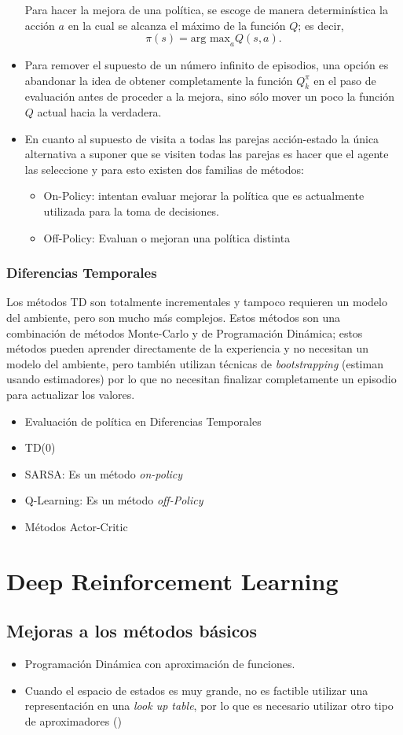 \documentclass[11pt]{article}
\theoremstyle{plain}
\begin{document}
\begin{itemize}
Para hacer la mejora de una política, se escoge de manera determinística la acción $a$ en la cual se alcanza el máximo de la función $Q$; es decir,
\[ \pi(s) = \textrm{arg max}_a Q(s,a).\]
\item Para remover el supuesto de un número infinito de episodios, una opción es abandonar la idea de obtener completamente la función $Q^\pi_k$ en el paso de evaluación antes de proceder a la mejora, sino sólo mover un poco la función $Q$ actual hacia la verdadera.
\item En cuanto al supuesto de visita a todas las parejas acción-estado la única alternativa a suponer que se visiten todas las parejas es hacer que el agente las seleccione y para esto existen dos familias de métodos:
							\begin{itemize}
									\item On-Policy: intentan evaluar mejorar la política que es actualmente utilizada para la toma de decisiones.
									\item Off-Policy: Evaluan o mejoran una política distinta
							\end{itemize}
\end{itemize}
\subsubsection{Diferencias Temporales}
Los métodos TD son totalmente incrementales y tampoco requieren un modelo del ambiente, pero son mucho más complejos. Estos métodos son una combinación de métodos Monte-Carlo y de Programación Dinámica; estos métodos pueden aprender directamente de la experiencia y no necesitan un modelo del ambiente, pero también utilizan técnicas de \textit{bootstrapping} (estiman usando estimadores) por lo que no necesitan finalizar completamente un episodio para actualizar los valores.
\begin{itemize}
\item Evaluación de política en Diferencias Temporales
\item TD(0)
\item SARSA: Es un método \textit{on-policy}
\item Q-Learning: Es un método \textit{off-Policy}
\item Métodos Actor-Critic
\end{itemize}
\section{Deep Reinforcement Learning}
\subsection{Mejoras a los métodos básicos}
	\begin{itemize}
		\item Programación Dinámica con aproximación de funciones.
		\item Cuando el espacio de estados es muy grande, no es factible utilizar una representación en una \textit{look up table}, por lo que es necesario utilizar otro tipo de aproximadores (\cite{busoniu2010reinforcement})
	\end{itemize}
\end{document}
